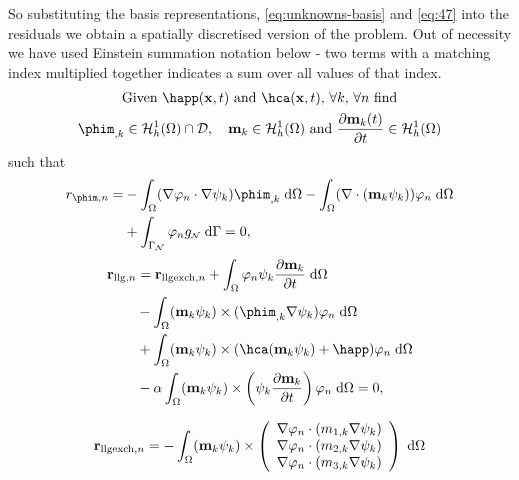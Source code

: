 So substituting the basis representations, \eqref{eq:unknowns-basis} and \eqref{eq:47} into the residuals we obtain a spatially discretised version of the problem. Out of necessity we have used Einstein summation notation below - two terms with a matching index multiplied together indicates a sum over all values of that index.
\begin{gather}
  \label{res:tintro}
  \text{Given $\happ(\xv,t)$ and $\hca(\xv,t)$, $\forall k$, $\forall \ndi$ find} \notag \\
  \phim_{,k} \in \ts \cap \Dfs, \quad
  \mv_{k} \in \ts \text{ and }
  \pd{\mv_k(t)}{t} \in \ts \notag
\end{gather}
such that
\begin{align}
  r_{\phim, \ndi} =
  & - \int_{\magd} (\nabla \tn \cdot \nabla \sk) \phim_{,k} \d \magd \notag
  - \int_{\magd} (\nabla \cdot (\mv_{k} \sk) ) \tn \d \magd \\
  & + \int_{\boundd_{\Neu}} \tn g_\Neu \d \boundd = 0,
  \label{res:tphi}
\end{align}
\begin{align}
 \mathbf{r}_{\text{llg},\ndi} &=
 \mathbf{r}_{\text{llgexch},\ndi} +  \int_{\magd} \tn \sk \pd{\mv_k}{t} \d \magd \notag \\ %
  &- \int_{\magd} (\mv_k \sk) \times ( \phim_{,k} \nabla \sk) \tn \d \magd \notag \\
  &+ \int_{\magd} (\mv_k \sk) \times ( \hca(\mv_k\sk) + \happ) \tn \d \magd \notag \\
  &- \dampc \int_{\magd}  (\mv_k\sk) \times \left( \sk \pd{\mv_k}{t} \right) \tn \d \magd = 0,
  \label{res:tllg}
\end{align}

\begin{equation}
  \mathbf{r}_{\text{llgexch},n} = - \int_\Omega (\mathbf{m}_k {\psi_k}) \times
  \left( \begin{array}{c} \nabla {\varphi_n} \cdot (m_{1,k} \nabla {\psi_k}) \\ \nabla {\varphi_n} \cdot (m_{2,k} \nabla {\psi_k}) \\ \nabla {\varphi_n} \cdot (m_{3,k} \nabla {\psi_k}) \end{array} \right) {\; \text{d}}\Omega
\end{equation}

